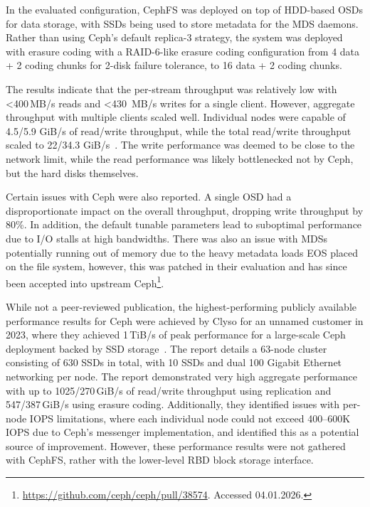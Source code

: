 
In the evaluated configuration, \ac{CephFS} was deployed on top of \acs{HDD}-based \acp{OSD} for data storage, with \acp{SSD} being used to store metadata for the \ac{MDS} daemons. Rather than using Ceph's default replica-3 strategy, the system was deployed with erasure coding with a \acs{RAID}-6-like erasure coding configuration from 4 data + 2 coding chunks for 2-disk failure tolerance, to 16 data + 2 coding chunks.


The results indicate that the per-stream throughput was relatively low with  <400\,MB/s reads and <430\ MB/s writes for a single client. However, aggregate throughput with multiple clients scaled well. Individual nodes were capable of 4.5/5.9 GiB/s of read/write throughput, while the total read/write throughput scaled to 22/34.3 GiB/s~\cite[p.~4]{cern-evaluating-cephfs-perf}. The write performance was deemed to be close to the network limit, while the read performance was likely bottlenecked not by Ceph, but the hard disks themselves.


Certain issues with Ceph were also reported. A single \ac{OSD} had a disproportionate impact on the overall throughput, dropping write throughput by 80\%. In addition, the default tunable parameters lead to suboptimal performance due to \ac{I/O} stalls at high bandwidths. There was also an issue with \acp{MDS} potentially running out of memory due to the heavy metadata loads \ac{EOS} placed on the file system, however, this was patched in their evaluation and has since been accepted into upstream Ceph\footnote{\url{https://github.com/ceph/ceph/pull/38574}. Accessed 04.01.2026.}.


While not a peer-reviewed publication, the highest-performing publicly available performance results for Ceph were achieved by Clyso for an unnamed customer in 2023, where they achieved 1\,TiB/s of peak performance for a large-scale Ceph deployment backed by \ac{SSD} storage~\cite{ceph-1tib}. The report details a 63-node cluster consisting of 630 \acp{SSD} in total, with 10 \acp{SSD} and dual 100 Gigabit Ethernet networking per node. The report demonstrated very high aggregate performance with up to 1025/270\,GiB/s of read/write throughput using replication and 547/387\,GiB/s using erasure coding. Additionally, they identified issues with per-node \ac{IOPS} limitations, where each individual node could not exceed 400--600K \ac{IOPS} due to Ceph's messenger implementation, and identified this as a potential source of improvement. However, these performance results were not gathered with \ac{CephFS}, rather with the lower-level \ac{RBD} block storage interface.
